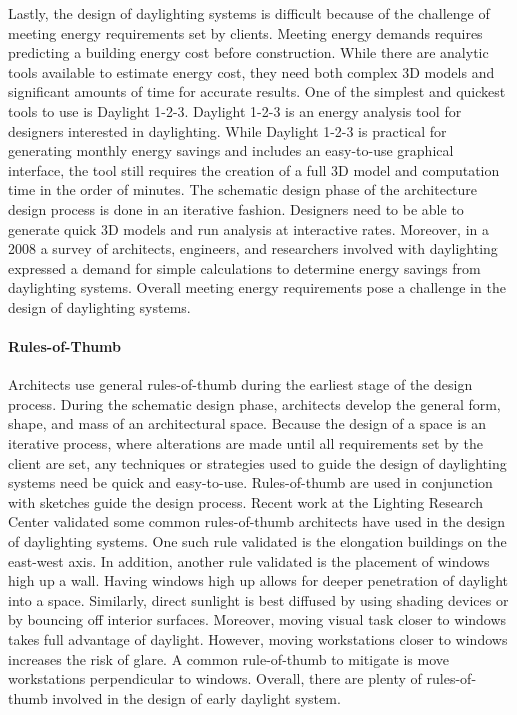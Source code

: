     Lastly, the design of daylighting systems is difficult because of the challenge of meeting energy requirements set by clients.
    Meeting energy demands requires predicting a building energy cost before construction.
    While there are analytic tools available to estimate energy cost, they need both complex 3D models and significant amounts of time for accurate results.
    One of the simplest and quickest tools to use is Daylight 1-2-3.
    Daylight 1-2-3 is an energy analysis tool for designers interested in daylighting.
    While Daylight 1-2-3 is practical for generating monthly energy savings and includes an easy-to-use graphical interface, the tool still requires the creation of a full 3D model and computation time in the order of minutes. \cite{Reinhart}
    The schematic design phase of the architecture design process is done in an iterative fashion.
    Designers need to be able to generate quick 3D models and run analysis at interactive rates.
    Moreover, in a 2008 a survey of architects, engineers, and researchers involved with daylighting expressed a demand for simple calculations to determine energy savings from daylighting systems.\cite{Galasiu} 
    Overall meeting energy requirements pose a challenge in the design of daylighting systems. \\


    \paragraph{Rules-of-Thumb}
    Architects use general rules-of-thumb during the earliest stage of the design process. 
    During the schematic design phase, architects develop the general form, shape, and mass of an architectural space.
    Because the design of a space is an iterative process, where alterations are made until all requirements set by the client are set\cite{Suwa}, any techniques or strategies used to guide the design of daylighting systems need be quick and easy-to-use. Rules-of-thumb are used in conjunction with sketches guide the design process.
    Recent work at the Lighting Research Center validated some common rules-of-thumb architects have used in the design of daylighting systems\cite{Leslie}.
    One such rule validated is the elongation buildings on the east-west axis.
    In addition, another rule validated is the placement of windows high up a wall.
    Having windows high up allows for deeper penetration of daylight into a space.
    Similarly, direct sunlight is best diffused by using shading devices or by bouncing off interior surfaces.
    Moreover, moving visual task closer to windows takes full advantage of daylight.
    However, moving workstations closer to windows increases the risk of glare. A common rule-of-thumb to mitigate is move workstations perpendicular to windows.
    Overall, there are plenty of rules-of-thumb involved in the design of early daylight system.\\

